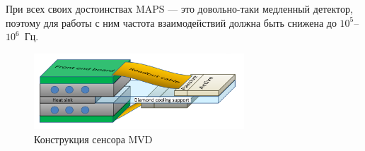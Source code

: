 При всех своих достоинствах MAPS --- это довольно-таки медленный детектор, поэтому для работы с ним частота взаимодействий должна быть снижена до $10^5$--$10^6$~Гц.



\begin{figure}[H]
\centering
\includegraphics[width=0.7\textwidth]{pictures/MVD_3.png}
\caption{Конструкция сенсора MVD }
\label{fig:MVD23}
\end{figure}


